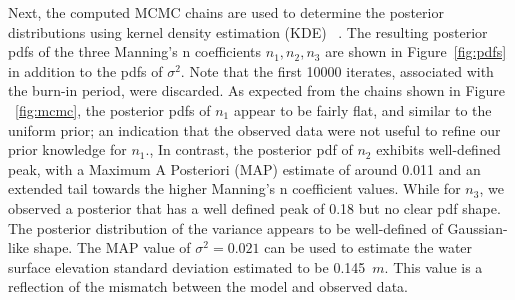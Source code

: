 Next, the computed MCMC chains are used to determine the posterior 
distributions using kernel density estimation (KDE)
~\citep{Parzen1962,Silverman1986}.  The resulting posterior pdfs 
of the three Manning's n coefficients $n_1,n_2,n_3$ are shown 
in Figure~\ref{fig:pdfs} in addition to the pdfs of $\sigma^2$. 
Note that the first 10000 iterates, associated with the burn-in period, were discarded.  
As expected from the chains shown in Figure
~\ref{fig:mcmc}, the posterior pdfs of $n_1$ appear to be fairly flat, 
and similar to the uniform prior; an indication that 
the observed data were not useful to refine our prior knowledge for $n_1$.,
In contrast, the posterior pdf of $n_2$ exhibits well-defined peak, 
with a Maximum A Posteriori (MAP) estimate of around 0.011
and an extended tail towards the higher Manning's n coefficient values.
While for $n_3$, we observed a posterior that has a well defined peak
of 0.18 but no clear pdf shape. The posterior distribution of the variance 
appears to be well-defined of Gaussian-like shape. 
The MAP value of $\sigma^2=0.021$ can be used to estimate the water surface elevation standard 
deviation estimated to be 0.145~$m$. 
This value is a reflection of the mismatch between the model and 
observed data.





